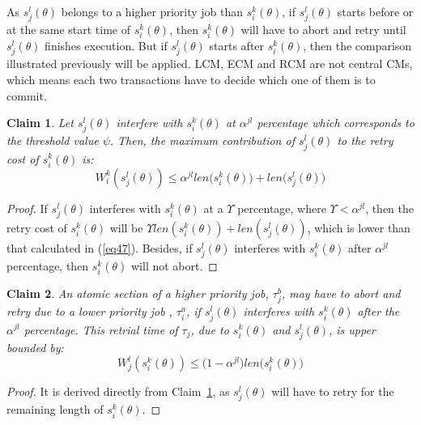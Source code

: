 \documentclass[conference]{IEEEtran}
\newtheorem{clm}{Claim}
\begin{document}
As $s_{j}^{l}(\theta)$ belongs to a higher priority job than $s_{i}^{k}(\theta)$, if $s_{j}^{l}(\theta)$ starts before or at the same start time of
$s_{i}^{k}(\theta)$, then $s_{i}^{k}(\theta)$ will have to abort
and retry until $s_{j}^{l}(\theta)$ finishes execution. But if $s_{j}^{l}(\theta)$
starts after $s_{i}^{k}(\theta)$, then the comparison illustrated
previously will be applied. LCM, ECM and RCM are not central CMs, which means each two transactions have to decide which one of them is to commit.

\begin{clm}
\label{LCM_higher_rc}
Let $s_{j}^{l}(\theta)$ interfere with $s_{i}^{k}(\theta)$ at $\alpha^{jl}$
percentage which corresponds to the threshold value $\psi$. Then, the maximum contribution of $s_{j}^{l}(\theta)$ to the retry cost of $s_{i}^{k}(\theta)$ is:
\begin{equation}
W_i^k(s_j^l(\theta))\le \alpha^{jl}len\Big(s_{i}^{k}(\theta)\Big)+len\Big(s_{j}^{l}(\theta)\Big)\label{eq47}\end{equation}
\end{clm}
\begin{proof}
If $s_{j}^{l}(\theta)$ interferes with $s_{i}^{k}(\theta)$
at a $\Upsilon$ percentage, where $\Upsilon<\alpha^{jl}$,
then the retry cost of $s_{i}^{k}(\theta)$ will be $\Upsilon len(s_{i}^{k}(\theta))+len(s_{j}^{l}(\theta))$, which is lower than that calculated in (\ref{eq47}). Besides, 
if $s_{j}^{l}(\theta)$ interferes with $s_{i}^{k}(\theta)$ after
$\alpha^{jl}$ percentage, then $s_{i}^{k}(\theta)$ will not
abort.
\end{proof}

\begin{clm}
\label{LCM_lower_rc}
An atomic section of a higher priority job, $\tau_{j}^b$, may have to abort and retry due to a lower priority job	, $\tau_{i}^a$, if $s_{j}^{l}(\theta)$ interferes
with $s_{i}^{k}(\theta)$ after the $\alpha^{jl}$ percentage.
This retrial time of $\tau_{j}$, due to $s_{i}^{k}(\theta)$ and $s_{j}^{l}(\theta)$,
is upper bounded by:
 \begin{equation}
W_j^l(s_i^k(\theta))\le \Big(1-\alpha^{jl}\Big)len\Big(s_{i}^{k}(\theta)\Big)\label{eq48}\end{equation}
\end{clm}
\begin{proof}
It is derived directly from Claim~\ref{LCM_higher_rc}, as $s_j^l(\theta)$ will have to retry for the remaining length of $s_i^k(\theta)$.
\end{proof}
\end{document}
